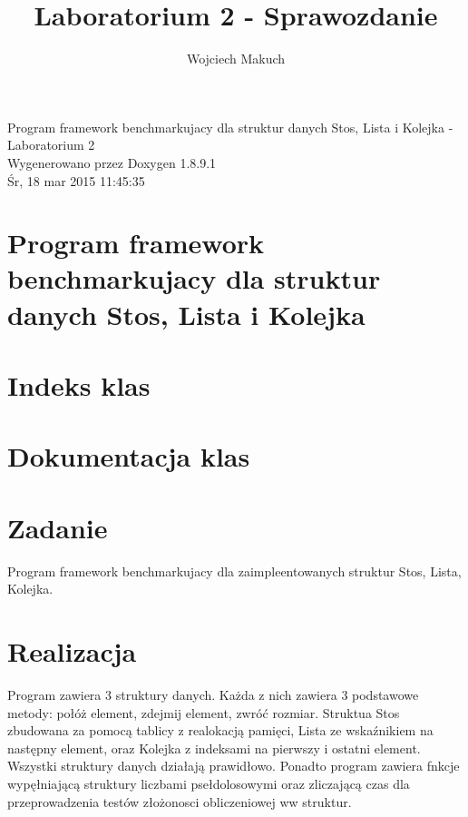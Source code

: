 \documentclass[twoside]{article}
\newcommand{\+}{\discretionary{\mbox{\scriptsize$\hookleftarrow$}}{}{}}
\begin{document}
\hypersetup{pageanchor=false,
             bookmarks=true,
             bookmarksnumbered=true,
             pdfencoding=unicode
            }
\begin{titlepage}
\vspace*{7cm}
\begin{center}%
{\Large Program framework benchmarkujacy dla struktur danych Stos, Lista i Kolejka -\/ Laboratorium 2 }\\
\vspace*{1cm}
{\large Wygenerowano przez Doxygen 1.8.9.1}\\
\vspace*{0.5cm}
{\small Śr, 18 mar 2015 11:45:35}\\
\end{center}
\end{titlepage}
\tableofcontents
{}
\hypersetup{pageanchor=true}

\section{Program framework benchmarkujacy dla struktur danych Stos, Lista i Kolejka}
\label{index}\hypertarget{index}{}
\section{Indeks klas}

\section{Dokumentacja klas}





\title{Laboratorium 2 - Sprawozdanie}
\author{Wojciech Makuch}

	\maketitle
	\section{Zadanie}
	Program framework benchmarkujacy dla zaimpleentowanych struktur Stos, Lista, Kolejka.
	\section{Realizacja}
	Program zawiera 3 struktury danych. Każda z nich zawiera 3 podstawowe metody: połóż element, zdejmij element, zwróć rozmiar. Struktua Stos zbudowana za pomocą tablicy z realokacją pamięci, Lista ze wskaźnikiem na następny element, oraz Kolejka z indeksami na pierwszy i ostatni element. Wszystki struktury danych działają prawidłowo.
	Ponadto program zawiera fnkcje wypęłniającą struktury liczbami psełdolosowymi oraz zliczającą czas dla przeprowadzenia testów złożonosci obliczeniowej ww struktur.
\end{document}
